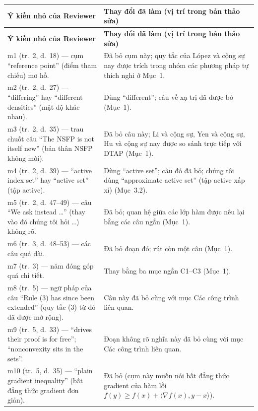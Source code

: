 \documentclass[11pt]{article}
\begin{document}
\medskip
{\footnotesize
\setlength{\tabcolsep}{5pt}
\renewcommand{\arraystretch}{1.25}
\begin{longtable}{@{}>{\raggedright\arraybackslash}p{}
                    >{\raggedright\arraybackslash}p{}@{}}
\toprule
\textbf{Ý kiến nhỏ của Reviewer} & \textbf{Thay đổi đã làm (vị trí trong bản thảo sửa)}\\
\midrule
\endfirsthead
\toprule
\textbf{Ý kiến nhỏ của Reviewer} & \textbf{Thay đổi đã làm (vị trí trong bản thảo sửa)}\\
\midrule
\endhead
\bottomrule
\endfoot
m1 (tr.~2, d.~18) --- cụm ``reference point'' (điểm tham chiếu) mơ hồ.
  & Đã bỏ cụm này; quy tắc của L\'opez và cộng sự nay được trích trong nhóm các phương pháp tự thích nghi ở Mục~1.\\
m2 (tr.~2, d.~27) --- ``differing'' hay ``different densities'' (mật độ khác nhau).
  & Dùng ``different''; câu về xạ trị đã được bỏ (Mục~1).\\
m3 (tr.~2, d.~35) --- trau chuốt câu ``The NSFP is not itself new'' (bản thân NSFP không mới).
  & Đã bỏ câu này; Li và cộng sự, Yen và cộng sự, Hu và cộng sự nay được so sánh trực tiếp với DTAP (Mục~1).\\
m4 (tr.~2, d.~39) --- ``active index set'' hay ``active set'' (tập active).
  & Dùng ``active set''; câu đó đã bỏ; chúng tôi dùng ``approximate active set'' (tập active xấp xỉ) (Mục~3.2).\\
m5 (tr.~2, d.~47--49) --- câu ``We ask instead \dots'' (thay vào đó chúng tôi hỏi \dots) không rõ.
  & Đã bỏ; quan hệ giữa các lớp hàm được nêu lại bằng các câu ngắn (Mục~1).\\
m6 (tr.~3, d.~48--53) --- các câu quá dài.
  & Đã bỏ đoạn đó; rút còn một câu (Mục~1).\\
m7 (tr.~3) --- năm đóng góp quá chi tiết.
  & Thay bằng ba mục ngắn C1--C3 (Mục~1).\\
m8 (tr.~5) --- ngữ pháp của câu ``Rule (3) has since been extended'' (quy tắc (3) từ đó đã được mở rộng).
  & Câu này đã bỏ cùng với mục Các công trình liên quan.\\
m9 (tr.~5, d.~33) --- ``drives their proof is for free''; ``nonconvexity sits in the sets''.
  & Đoạn không rõ nghĩa này đã bỏ cùng với mục Các công trình liên quan.\\
m10 (tr.~5, d.~35) --- ``plain gradient inequality'' (bất đẳng thức gradient đơn giản).
  & Đã bỏ (cụm này muốn nói bất đẳng thức gradient của hàm lồi $f(y)\ge f(x)+\langle\nabla f(x),y-x\rangle$).\\

\end{longtable}}
\end{document}
